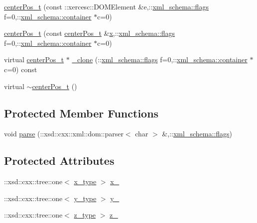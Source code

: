 \begin{DoxyCompactItemize}
\item 
\hyperlink{classcenterPos__t_ac9f4d867513a4ff3f2ed8ca249818410}{center\-Pos\-\_\-t} (const \-::xercesc\-::\-D\-O\-M\-Element \&e,\-::\hyperlink{namespacexml__schema_a0612287d030cb2732d31a45b258fdc87}{xml\-\_\-schema\-::flags} f=0,\-::\hyperlink{namespacexml__schema_ada9aa30dc722e93ee2ed7243085402a5}{xml\-\_\-schema\-::container} $\ast$c=0)
\item 
\hyperlink{classcenterPos__t_a658fc6ab4eeab6a42f3ced3fc7924cbb}{center\-Pos\-\_\-t} (const \hyperlink{classcenterPos__t}{center\-Pos\-\_\-t} \&\hyperlink{classcenterPos__t_aed87cbea230ad34c4154ce268a729c61}{x},\-::\hyperlink{namespacexml__schema_a0612287d030cb2732d31a45b258fdc87}{xml\-\_\-schema\-::flags} f=0,\-::\hyperlink{namespacexml__schema_ada9aa30dc722e93ee2ed7243085402a5}{xml\-\_\-schema\-::container} $\ast$c=0)
\item 
virtual \hyperlink{classcenterPos__t}{center\-Pos\-\_\-t} $\ast$ \hyperlink{classcenterPos__t_a9758307db31e22be98e06dca83549274}{\-\_\-clone} (\-::\hyperlink{namespacexml__schema_a0612287d030cb2732d31a45b258fdc87}{xml\-\_\-schema\-::flags} f=0,\-::\hyperlink{namespacexml__schema_ada9aa30dc722e93ee2ed7243085402a5}{xml\-\_\-schema\-::container} $\ast$c=0) const 
\item 
virtual \hyperlink{classcenterPos__t_af4c8557584e72252459ddd989fa56b35}{$\sim$center\-Pos\-\_\-t} ()
\end{DoxyCompactItemize}
\subsection*{Protected Member Functions}
\begin{DoxyCompactItemize}
\item 
void \hyperlink{classcenterPos__t_a0de4ad0ae796ad49867c808a54900c9a}{parse} (\-::xsd\-::cxx\-::xml\-::dom\-::parser$<$ char $>$ \&,\-::\hyperlink{namespacexml__schema_a0612287d030cb2732d31a45b258fdc87}{xml\-\_\-schema\-::flags})
\end{DoxyCompactItemize}
\subsection*{Protected Attributes}
\begin{DoxyCompactItemize}
\item 
\-::xsd\-::cxx\-::tree\-::one$<$ \hyperlink{classcenterPos__t_ad9202ab9a64d0ac44ac212e2b8ad52f9}{x\-\_\-type} $>$ \hyperlink{classcenterPos__t_a17f007eddd609aec31759bf400c03dbb}{x\-\_\-}
\item 
\-::xsd\-::cxx\-::tree\-::one$<$ \hyperlink{classcenterPos__t_a729ec04aac9d1066004b319cca2879fd}{y\-\_\-type} $>$ \hyperlink{classcenterPos__t_a4e9b243a89175485826c3d57509fcaf8}{y\-\_\-}
\item 
\-::xsd\-::cxx\-::tree\-::one$<$ \hyperlink{classcenterPos__t_a6c424433a912263b9c8644a89ad14082}{z\-\_\-type} $>$ \hyperlink{classcenterPos__t_a51b70fc13ca57ea7638fbe292478f7de}{z\-\_\-}
\end{DoxyCompactItemize}



